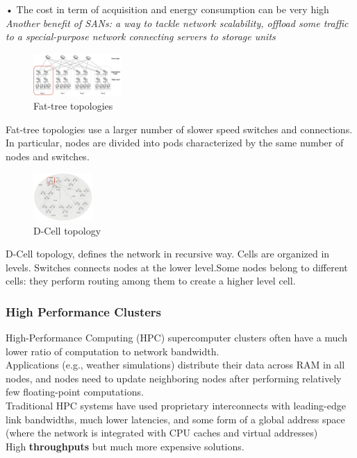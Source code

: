 \documentclass[10pt, oneside]{article}
\begin{document}
• The cost in term of acquisition and energy consumption can be very high\\
{\sl Another benefit of SANs: a way to tackle network scalability, offload some traffic to a special-purpose network connecting servers to storage units
}
\begin{multicols}{2}
    \begin{figure}[H]
        \begin{center}
        \includegraphics[width=0.3\textwidth]{img/img23.png}
        \caption{Fat-tree topologies}
        \label{fig:Fat-tree topologies}
        \end{center}
    \end{figure}
Fat-tree topologies use a larger number of slower speed switches and connections. In particular, nodes are divided into pods characterized by the same number of nodes and switches.
    \columnbreak
    \begin{figure}[H]
        \begin{center}
        \includegraphics[width=0.2\textwidth]{img/img24.png}
        \caption{D-Cell topology}
        \label{fig:D-Cell topology}
        \end{center}
    \end{figure}
D-Cell topology, defines the network in recursive way. Cells are organized in levels. Switches connects nodes at the lower level.Some nodes belong to different cells: they perform routing among them to create a higher level cell. 
\end{multicols}
\subsubsection{High Performance Clusters}
High-Performance Computing (HPC) supercomputer clusters often have a much lower ratio of computation to network bandwidth.\\
\newline
Applications (e.g., weather simulations) distribute their data across RAM in all nodes, and nodes need to update neighboring nodes after performing relatively few floating-point computations.\\
Traditional HPC systems have used proprietary interconnects with leading-edge link bandwidths, much lower latencies, and some form of a global address space (where the network is integrated with CPU caches and virtual addresses)\\
\newline
High {\bf throughputs} but much more expensive solutions.
\end{document}
